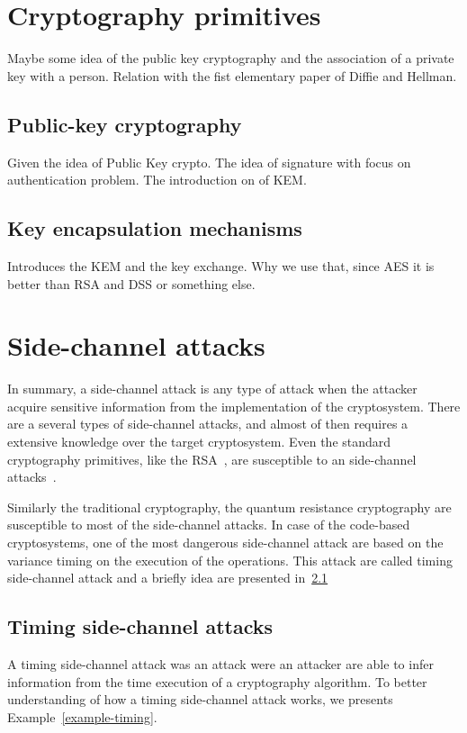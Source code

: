 \section{Cryptography primitives}
Maybe some idea of the public key cryptography and the association of a private key with a person. Relation with the fist elementary paper of Diffie and Hellman.
\subsection{Public-key cryptography}
Given the idea of Public Key crypto. The idea of signature with focus on authentication problem. The introduction on of KEM.
\subsection{Key encapsulation mechanisms}
Introduces the KEM and the key exchange. Why we use that, since AES it is better than RSA and DSS or something else.

\section{Side-channel attacks}
In summary, a side-channel attack is any type of attack when the attacker acquire sensitive information from the implementation of the cryptosystem. There are a several types of side-channel attacks, and almost of then requires a extensive knowledge over the target cryptosystem. Even the standard cryptography primitives, like the RSA~\cite{rivest1978method}, are susceptible to an side-channel attacks~\cite{kocher1996timing}.

Similarly the traditional cryptography, the quantum resistance cryptography are susceptible to most of the side-channel attacks. In case of the code-based cryptosystems, one of the most dangerous side-channel attack are based on the variance timing on the execution of the operations. This attack are called timing side-channel attack and a briefly idea are presented in~\ref{sub:timing-attack}

\subsection{Timing side-channel attacks}\label{sub:timing-attack}
A timing side-channel attack was an attack were an attacker are able to infer information from the time execution of a cryptography algorithm. To better understanding of how a timing side-channel attack works, we presents Example~\ref{example-timing}. 


